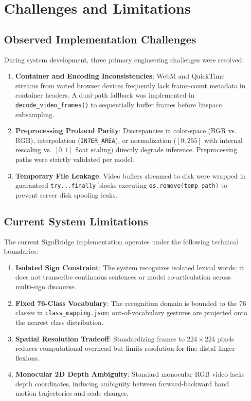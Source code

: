 \chapter{Challenges and Limitations}
\label{ch:challenges}

\section{Observed Implementation Challenges}
\label{sec:observed_challenges}
During system development, three primary engineering challenges were resolved:
\begin{enumerate}
    \item \textbf{Container and Encoding Inconsistencies}: WebM and QuickTime streams from varied browser devices frequently lack frame-count metadata in container headers. A dual-path fallback was implemented in \texttt{decode\_video\_frames()} to sequentially buffer frames before linspace subsampling.
    \item \textbf{Preprocessing Protocol Parity}: Discrepancies in color-space (BGR vs. RGB), interpolation (\texttt{INTER\_AREA}), or normalization ($[0, 255]$ with internal rescaling vs. $[0, 1]$ float scaling) directly degrade inference. Preprocessing paths were strictly validated per model.
    \item \textbf{Temporary File Leakage}: Video buffers streamed to disk were wrapped in guaranteed \texttt{try...finally} blocks executing \texttt{os.remove(temp\_path)} to prevent server disk spooling leaks.
\end{enumerate}

\section{Current System Limitations}
\label{sec:system_limitations}
The current SignBridge implementation operates under the following technical boundaries:
\begin{enumerate}
    \item \textbf{Isolated Sign Constraint}: The system recognizes isolated lexical words; it does not transcribe continuous sentences or model co-articulation across multi-sign discourse.
    \item \textbf{Fixed 76-Class Vocabulary}: The recognition domain is bounded to the 76 classes in \texttt{class\_mapping.json}; out-of-vocabulary gestures are projected onto the nearest class distribution.
    \item \textbf{Spatial Resolution Tradeoff}: Standardizing frames to $224\times224$ pixels reduces computational overhead but limits resolution for fine distal finger flexions.
    \item \textbf{Monocular 2D Depth Ambiguity}: Standard monocular RGB video lacks depth coordinates, inducing ambiguity between forward-backward hand motion trajectories and scale changes.
\end{enumerate}
